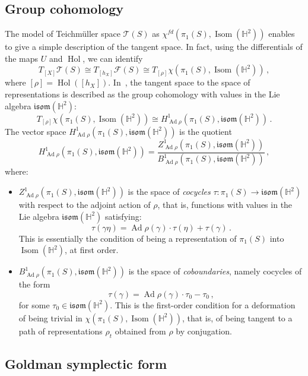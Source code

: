 \documentclass[11pt]{article}
\theoremstyle{definition}
\numberwithin{equation}{section}
\numberwithin{figure}{section}
\numberwithin{table}{section}
\newcommand{\Teich}{\mathcal{T}}
\newcommand{\Hyp}{\mathbb{H}}
\newcommand{\isom}{\mathfrak{isom}}
\DeclareMathOperator{\Isom}{Isom}
\DeclareMathOperator{\Ad}{Ad}
\DeclareMathOperator{\Hol}{Hol}
\begin{document}
\subsection{Group cohomology}\label{sect2.2}

The model of Teichm\"uller space $\Teich(S)$ as $\chi^{f\!d}(\pi_1(S),\Isom(\Hyp^2))$ enables to give a simple description of the tangent space. In fact, using the differentials of the maps $U$ and $\Hol$, we can identify
\[
T_{[X]}\Teich(S)\cong T_{[h_X]}\mathcal F(S)\cong T_{[\rho]}\chi(\pi_1(S),\Isom(\Hyp^2))\,,
\]
where $[\rho]=\Hol([h_X])$. In~\cite{Goldman}, the tangent space to the space of representations is described as the group cohomology with values in the Lie algebra $\isom(\Hyp^2)$:
\[
T_{[\rho]}\chi\left(\pi_1(S),\Isom(\Hyp^2)\right)\cong H^1_{\Ad\rho}(\pi_1(S),\isom(\Hyp^2))\,.
\]
The vector space $H^1_{\Ad\rho}(\pi_1(S),\isom(\Hyp^2))$ is the quotient
\[
H^1_{\Ad\rho}\left(\pi_1(S),\isom(\Hyp^2)\right)=\frac{Z^1_{\Ad\rho}\left(\pi_1(S),\isom(\Hyp^2)\right)}{B^1_{\Ad\rho}\left(\pi_1(S),\isom(\Hyp^2)\right)}\,,
\]
where:
\begin{itemize}
\item $Z^1_{\Ad\rho}(\pi_1(S),\isom(\Hyp^2))$ is the space of \emph{cocycles} $\tau:\pi_1(S)\to\isom(\Hyp^2)$ with respect to the adjoint action of $\rho$, that is, functions with values in the Lie algebra $\isom(\Hyp^2)$ satisfying:
\begin{equation}\label{eq cocycle condition}
\tau(\gamma\eta)=\Ad\rho(\gamma)\cdot\tau(\eta)+\tau(\gamma)\,.
\end{equation}
This is essentially the condition of being a representation of $\pi_1(S)$ into $\Isom(\Hyp^2)$, at first order.
\item $B^1_{\Ad\rho}(\pi_1(S),\isom(\Hyp^2))$ is the space of \emph{coboundaries}, namely cocycles of the form
\begin{equation}\label{eq defi coboundary}
\tau(\gamma)=\Ad\rho(\gamma)\cdot\tau_0-\tau_0\,,
\end{equation}
for some $\tau_0\in\isom(\Hyp^2)$. This is the first-order condition for a deformation of being trivial in $\chi(\pi_1(S),\Isom(\Hyp^2))$, that is, of being tangent to a path of representations $\rho_t$ obtained from $\rho$ by conjugation.
\end{itemize}

\subsection{Goldman symplectic form}
\end{document}
